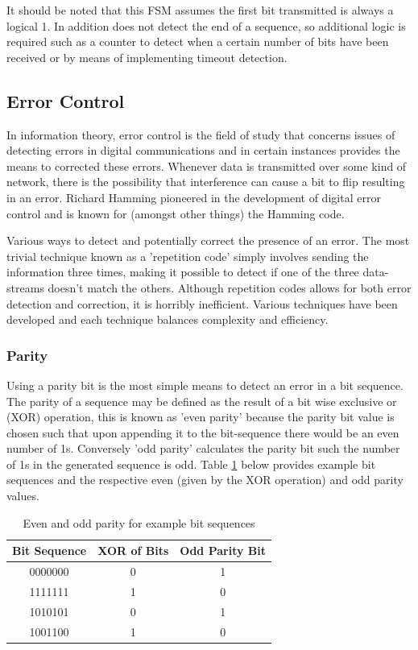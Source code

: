 It should be noted that this FSM assumes the first bit transmitted is always a logical 1. In addition does not detect the end of a sequence, so additional logic is required such as a counter to detect when a certain number of bits have been received or by means of implementing timeout detection.

\subsection{Error Control}

In information theory, error control is the field of study that concerns issues of detecting errors in digital communications and in certain instances provides the means to corrected these errors. Whenever data is transmitted over some kind of network, there is the possibility that interference can cause a bit to flip resulting in an error. Richard Hamming pioneered in the development of digital error control and is known for (amongst other things) the Hamming code.

Various ways to detect and potentially correct the presence of an error. The most trivial technique known as a 'repetition code' simply involves sending the information three times, making it possible to detect if one of the three data-streams doesn't match the others. Although repetition codes allows for both error detection and correction, it is horribly inefficient. Various techniques have been developed and each technique balances complexity and efficiency.

\subsubsection{Parity}
Using a parity bit is the most simple means to detect an error in a bit sequence. The parity of a sequence may be defined as the result of a bit wise exclusive or (XOR) operation, this is known as 'even parity' because the parity bit value is chosen such that upon appending it to the bit-sequence there would be an even number of 1s. Conversely 'odd parity' calculates the parity bit such the number of 1s in the generated sequence is odd. Table \ref{tbl:party_examples} below provides example bit sequences and the respective even (given by the XOR operation) and odd parity values.

\begin{table}[H]
	\centering
	\begin{tabular}{ccc}
		\hline
		\multicolumn{1}{l}{\textbf{Bit Sequence}} & \textbf{XOR of Bits} & \multicolumn{1}{l}{\textbf{Odd Parity Bit}} \\ \hline
		0000000 & 0 & 1 \\ \hline
		1111111 & 1 & 0 \\ \hline
		1010101 & 0 & 1 \\ \hline
		1001100 & 1 & 0 \\ \hline
	\end{tabular}
	\caption{Even and odd parity for example bit sequences}
	\label{tbl:party_examples}
\end{table}

